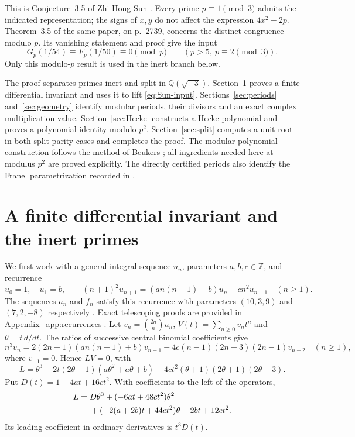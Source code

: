\documentclass[11pt,a4paper]{article}
\theoremstyle{remark}\newtheorem{remark}[theorem]{Remark}
\newcommand{\Z}{\mathbb Z}\newcommand{\Q}{\mathbb Q}
\begin{document}
This is Conjecture~3.5 of Zhi-Hong Sun
\cite[p.~2742]{sun}. Every prime $p\equiv1\pmod3$ admits the indicated
representation; the signs of $x,y$ do not affect the expression $4x^2-2p$.
Theorem~3.5 of the same paper, on p.~2739, concerns the distinct congruence
modulo $p$. Its vanishing statement and proof give the input
\begin{equation}\label{eq:Sun-input}
 G_p(1/54)\equiv F_p(1/50)\equiv0\pmod p
 \qquad(p>5,\ p\equiv2\pmod3).
\end{equation}
Only this modulo-$p$ result is used in the inert branch below.

The proof separates primes inert and split in $\Q(\sqrt{-3})$.
Section~\ref{sec:invariant} proves a finite differential invariant and
uses it to lift \eqref{eq:Sun-input}. Sections~\ref{sec:periods}
and~\ref{sec:geometry} identify modular periods, their divisors and an exact
complex multiplication value. Section~\ref{sec:Hecke} constructs a Hecke
polynomial and proves a polynomial identity modulo $p^2$.
Section~\ref{sec:split} computes a unit root in both split parity cases and
completes the proof. The modular polynomial construction follows the method
of Beukers \cite[Lemma~3.7 and Section~5]{beukers}; all ingredients needed
here at modulus $p^2$ are proved explicitly. The directly certified periods
also identify the Franel parametrization recorded in
\cite[Section~9.15]{beukers}.

\section{A finite differential invariant and the inert primes}
\label{sec:invariant}
We first work with a general integral sequence $u_n$, parameters
$a,b,c\in\Z$, and recurrence
\begin{equation}\label{eq:recurrence}
 u_0=1,\quad u_1=b,\qquad
 (n+1)^2u_{n+1}=(an(n+1)+b)u_n-cn^2u_{n-1}\quad(n\ge1).
\end{equation}
The sequences $a_n$ and $f_n$ satisfy this recurrence with parameters
$(10,3,9)$ and $(7,2,-8)$ respectively
\cite[pp.~2729--2730]{sun}. Exact telescoping proofs are provided in
Appendix~\ref{app:recurrences}. Let
$v_n=\binom{2n}n u_n$, $V(t)=\sum_{n\ge0}v_nt^n$ and $\theta=t\,d/dt$.
The ratios of successive central binomial coefficients give
\begin{equation}\label{eq:central-rec}
 n^3v_n=2(2n-1)(an(n-1)+b)v_{n-1}
 -4c(n-1)(2n-3)(2n-1)v_{n-2}\quad(n\ge1),
\end{equation}
where $v_{-1}=0$. Hence $LV=0$, with
\begin{equation}\label{eq:L}
 L=\theta^3-2t(2\theta+1)(a\theta^2+a\theta+b)
       +4ct^2(\theta+1)(2\theta+1)(2\theta+3).
\end{equation}
Put $D(t)=1-4at+16ct^2$. With coefficients to the left of the operators,
\begin{align}\label{eq:L-expanded}
 L={}&D\theta^3+(-6at+48ct^2)\theta^2\notag\\
 &+(-2(a+2b)t+44ct^2)\theta-2bt+12ct^2.
\end{align}
Its leading coefficient in ordinary derivatives is $t^3D(t)$.
\end{document}
